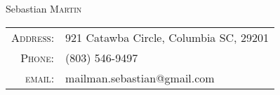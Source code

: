 \documentclass[a4paper,10pt]{article}
\begin{document}

\pagestyle{empty} %

\par{\centering
		{\Huge Sebastian \textsc{Martin}
	}\par}

\begin{center}
	\begin{tabular}{r|l}
    \textsc{Address:}   & 921 Catawba Circle, Columbia SC, 29201\\
    \textsc{Phone:}     & (803) 546-9497\\
    \textsc{email:}     & {mailman.sebastian@gmail.com}
\end{tabular}
\end{center}


\end{document}
